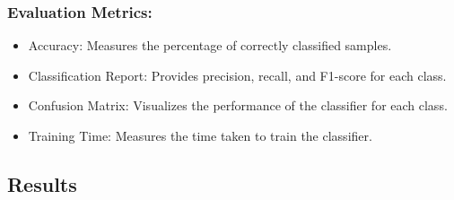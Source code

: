 \documentclass[a4paper,12pt]{article}
\begin{document}
        \subsubsection{Evaluation Metrics:}
            \begin{itemize}
                \item Accuracy: Measures the percentage of correctly classified samples.
                \item Classification Report: Provides precision, recall, and F1-score for each class.
                \item Confusion Matrix: Visualizes the performance of the classifier for each class.
                \item Training Time: Measures the time taken to train the classifier.
            \end{itemize}
    \subsection{Results}
\end{document}
